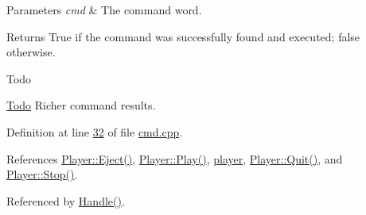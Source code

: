 \begin{DoxyParams}{Parameters}
{\em cmd} & The command word. \\
\hline
\end{DoxyParams}
\begin{DoxyReturn}{Returns}
True if the command was successfully found and executed; false otherwise. 
\end{DoxyReturn}
\begin{DoxyRefDesc}{Todo}
\item[\hyperlink{todo__todo000001}{Todo}]Richer command results. \end{DoxyRefDesc}


Definition at line \hyperlink{cmd_8cpp_source_l00032}{32} of file \hyperlink{cmd_8cpp_source}{cmd.\+cpp}.



References \hyperlink{player_8cpp_source_l00079}{Player\+::\+Eject()}, \hyperlink{player_8cpp_source_l00116}{Player\+::\+Play()}, \hyperlink{cmd_8hpp_source_l00048}{player}, \hyperlink{player_8cpp_source_l00126}{Player\+::\+Quit()}, and \hyperlink{player_8cpp_source_l00159}{Player\+::\+Stop()}.



Referenced by \hyperlink{cmd_8cpp_source_l00022}{Handle()}.


